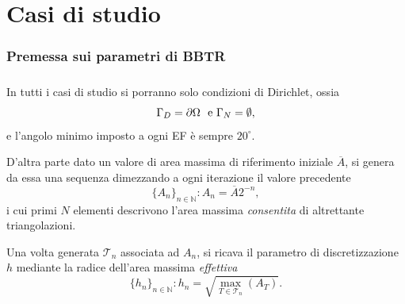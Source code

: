 \documentclass[11pt]{beamer}
\begin{document}
    \part{Casi di studio}
    \begin{frame}\partpage\end{frame}
    
        \section{Premessa sui parametri di BBTR}
        
            \begin{frame}\frametitle{\insertsection{}}
                In tutti i casi di studio si porranno solo condizioni di Dirichlet, ossia
                \begin{equation*}
                    \setlength{\abovedisplayskip}{5pt plus 2pt minus 2pt}  %
                    \setlength{\belowdisplayskip}{5pt plus 2pt minus 2pt}  %
                    \Gamma_D=\partial\Omega\ \ \text{e}\ \Gamma_N=\emptyset,
                \end{equation*}
                e l'angolo minimo imposto a ogni EF è sempre $20^\circ$.
                
                D'altra parte dato un valore di area massima di riferimento iniziale $\overline A$, si genera da essa una sequenza dimezzando a ogni iterazione il valore precedente
                \begin{equation*}
                    \{A_n\}_{n\in\mathbb N}:A_n=\overline A2^{-n},
                \end{equation*}
                i cui primi $N$ elementi descrivono l'area massima \textit{consentita} di altrettante triangolazioni.
                
                Una volta generata $\mathcal T_n$ associata ad $A_n$, si ricava il parametro di discretizzazione $h$ mediante la radice dell'area massima \textit{effettiva}
                \begin{equation*}
                    \{h_n\}_{n\in\mathbb N}:h_n=\sqrt{\max_{T\in\mathcal T_n}\left(A_T\right)}.
                \end{equation*}
            \end{frame}    
        
\end{document}
